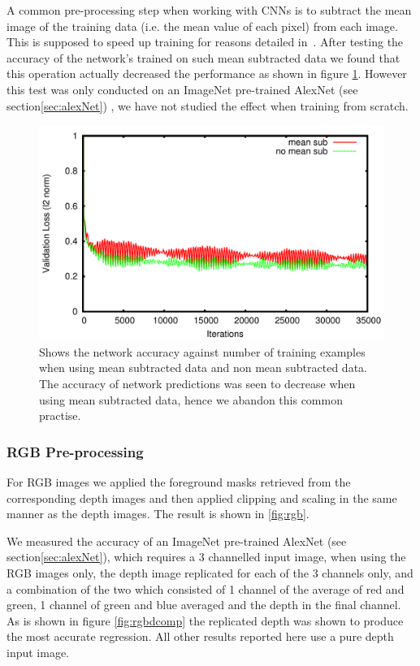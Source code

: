 \documentclass[11pt]{article} %
\begin{document}
A common pre-processing step when working with CNNs is to subtract the mean image of the training data (i.e. the mean value of each pixel) from each image. This is supposed to speed up training for reasons detailed in~\cite{LeCun1998a,Bottou2010,LeCun2012}. After testing the accuracy of the network's trained on such mean subtracted data we found that this operation actually decreased the performance as shown in figure \ref{fig:meanSubComp}. However this test was only conducted on an ImageNet pre-trained AlexNet (see section\ref{sec:alexNet}) , we have not studied the effect when training from scratch.

\begin{figure}
\centering
\includegraphics*[width=0.8\linewidth,clip]{meanSub.pdf} %
\caption{Shows the network accuracy against number of training examples when using mean subtracted data and non mean subtracted data. The accuracy of network predictions was seen to decrease when using mean subtracted data, hence we abandon this common practise.}
\label{fig:meanSubComp}
\end{figure}


\subsubsection{RGB Pre-processing}

For RGB images we applied the foreground masks retrieved from the corresponding depth images and then applied clipping and scaling in the same manner as the depth images. The result is shown in \ref{fig:rgb}. 

We measured the accuracy of an ImageNet pre-trained AlexNet (see section\ref{sec:alexNet}), which requires a 3 channelled input image, when using the RGB images only, the depth image replicated for each of the 3 channels only, and a combination of the two which consisted of 1 channel of the average of red and green, 1 channel of green and blue averaged and the depth in the final channel. As is shown in figure \ref{fig:rgbdcomp} the replicated depth was shown to produce the most accurate regression. All other results reported here use a pure depth input image. 
\end{document}
